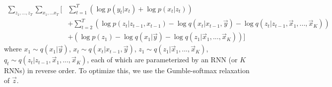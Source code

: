 \documentclass[12pt]{article}
\begin{document}
\begin{align}
    \sum_{z_1,...,z_T} \sum_{x_1,...x_T}[& \sum_{t=1}^T(\log p(y_t|x_t) + \log p(x_t|z_t)) \\ 
    & + \sum_{t=2}^T (\log p(z_t|z_{t-1},x_{t-1}) - \log q(x_t|x_{t-1},\vec{y}) - \log q(z_t|z_{t-1},\vec{x}_1, ..., \vec{x}_K)) \\
    & + (\log p(z_1) - \log q(x_1|\vec{y}) - \log q(z_1|\vec{x}_1, ..., \vec{x}_K))]  
\end{align}
where $x_1 \sim q(x_1|\vec{y})$, $x_t \sim q(x_t|x_{t-1},\vec{y})$, $z_1 \sim q(z_1|\vec{x}_1, ..., \vec{x}_K)$, $q_t \sim q(z_t|z_{t-1},\vec{x}_1, ..., \vec{x}_K)$, each of which are parameterized by an RNN (or $K$ RNNs) in reverse order. To optimize this, we use the Gumble-softmax relaxation of $\vec{z}$.
\end{document}
